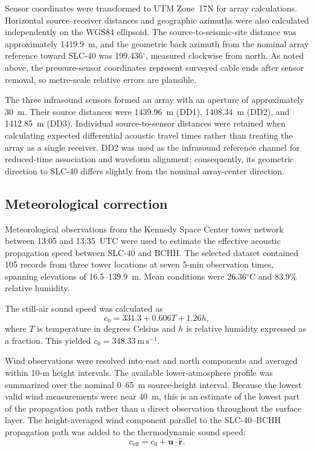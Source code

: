 \documentclass[]{seismica}
\begin{document}
Sensor coordinates were transformed to UTM Zone~17N for array calculations.
Horizontal source--receiver distances and geographic azimuths were also
calculated independently on the WGS84 ellipsoid. The source-to-seismic-site
distance was approximately 1419.9~m, and the geometric back azimuth from the
nominal array reference toward SLC-40 was 199.436$^\circ$, measured clockwise
from north. As noted above, the pressure-sensor coordinates represent surveyed
cable ends after sensor removal, so metre-scale relative errors are plausible.

The three infrasound sensors formed an array with an aperture of approximately
30~m. Their source distances were 1439.96~m (DD1), 1408.34~m (DD2), and
1412.85~m (DD3). Individual
source-to-sensor distances were retained when calculating expected
differential acoustic travel times rather than treating the array as a single
receiver. DD2 was used as the infrasound reference channel for reduced-time
association and waveform alignment; consequently, its geometric direction to
SLC-40 differs slightly from the nominal array-center direction.

\subsection{Meteorological correction}

Meteorological observations from the Kennedy Space Center tower network between
13:05 and 13:35~UTC were used to estimate the effective acoustic propagation
speed between SLC-40 and BCHH. The selected dataset contained 105 records from
three tower locations at seven 5-min observation times, spanning elevations of
16.5--139.9~m. Mean conditions were 26.36$^\circ$C and 83.9\% relative
humidity.

The still-air sound speed was calculated as
\begin{equation}
  c_0 = 331.3 + 0.606T + 1.26h,
  \label{eq:sound_speed}
\end{equation}
where $T$ is temperature in degrees Celsius and $h$ is relative humidity
expressed as a fraction. This yielded
$c_0=348.33~\mathrm{m\,s^{-1}}$.

Wind observations were resolved into east and north components and averaged
within 10-m height intervals. The available lower-atmosphere profile was
summarized over the nominal 0--65~m source-height interval. Because the lowest
valid wind measurements were near 40~m, this is an estimate of the lowest part
of the propagation path rather than a direct observation throughout the
surface layer. The height-averaged wind component parallel to the
SLC-40--BCHH propagation path was added to the thermodynamic sound speed:
\begin{equation}
  c_{\mathrm{eff}} =
  c_0 + \mathbf{u}\cdot\hat{\mathbf{r}}.
  \label{eq:effective_speed}
\end{equation}
\end{document}
